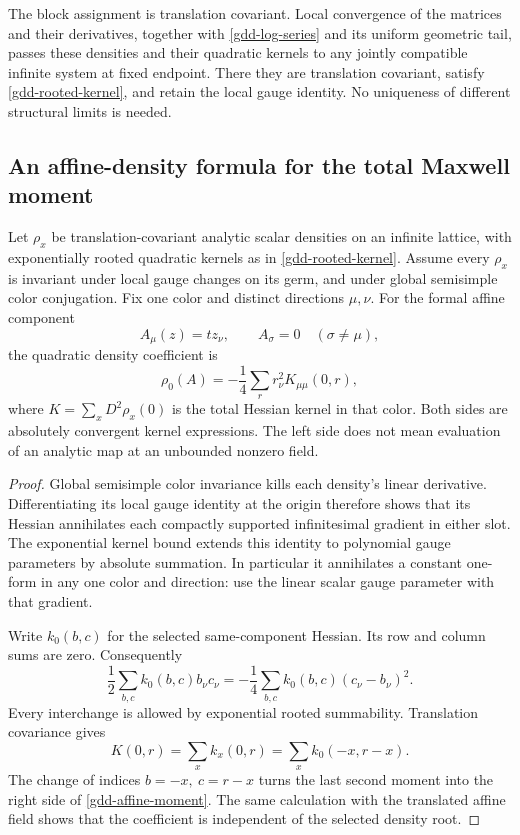 The block assignment is translation covariant. Local
convergence of the matrices and their derivatives, together
with \eqref{gdd-log-series} and its uniform geometric tail,
passes these densities and their quadratic kernels to
any jointly compatible infinite system at fixed endpoint.
There they are translation covariant, satisfy
\eqref{gdd-rooted-kernel}, and retain the local gauge identity.
No uniqueness of different structural limits is needed.

\subsection{An affine-density formula for the total Maxwell moment}
\label{gdd-moment-section}

\begin{lemma}
\label{gdd-moment-lemma}
Let \(\rho_x\) be translation-covariant analytic scalar
densities on an infinite lattice, with exponentially
rooted quadratic kernels as in \eqref{gdd-rooted-kernel}.
Assume every \(\rho_x\) is invariant under local gauge
changes on its germ, and under global semisimple color
conjugation. Fix one color and distinct directions
\(\mu,\nu\). For the formal affine component
\[
                  A_\mu(z)=t z_\nu,\qquad A_\sigma=0
                    \quad(\sigma\ne\mu),
\]
the quadratic density coefficient is
\begin{equation}
 [t^2]\rho_0(A)
       =-\frac14\sum_r r_\nu^2 K_{\mu\mu}(0,r),
 \label{gdd-affine-moment}
\end{equation}
where \(K=\sum_x D^2\rho_x(0)\) is the total Hessian
kernel in that color. Both sides are absolutely convergent
kernel expressions. The left side does not mean evaluation
of an analytic map at an unbounded nonzero field.
\end{lemma}

\begin{proof}
Global semisimple color invariance kills each density's
linear derivative. Differentiating its local gauge identity
at the origin therefore shows that its Hessian annihilates
each compactly supported infinitesimal gradient in either
slot. The exponential kernel bound extends this identity
to polynomial gauge parameters by absolute summation.
In particular it annihilates a constant one-form in any
one color and direction: use the linear scalar gauge
parameter with that gradient.

Write \(k_0(b,c)\) for the selected same-component Hessian.
Its row and column sums are zero. Consequently
\[
 \frac12\sum_{b,c} k_0(b,c)b_\nu c_\nu
   =-\frac14\sum_{b,c}k_0(b,c)(c_\nu-b_\nu)^2.
\]
Every interchange is allowed by exponential rooted
summability. Translation covariance gives
\[
 K(0,r)=\sum_x k_x(0,r)=\sum_x k_0(-x,r-x).
\]
The change of indices \(b=-x,\ c=r-x\) turns the last
second moment into the right side of
\eqref{gdd-affine-moment}. The same calculation with
the translated affine field shows that the coefficient
is independent of the selected density root.
\end{proof}

